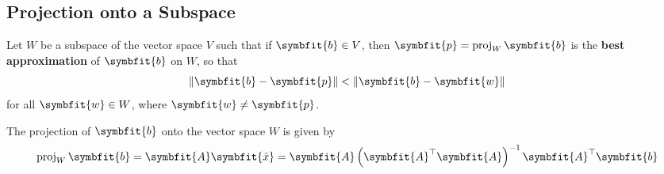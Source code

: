 \documentclass{article}
\begin{document}
	\subsection{Projection onto a Subspace}
	\begin{theorem}
		Let $W$ be a subspace of the vector space $V$ such that if $\symbfit{b}\in V$, then $\symbfit{p}=\proj_{W}\symbfit{b}$ is the \textbf{best approximation} of $\symbfit{b}$ on $W$, so that
		\begin{equation*}
			\norm{\symbfit{b}-\symbfit{p}}<\norm{\symbfit{b}-\symbfit{w}}
		\end{equation*}
		for all $\symbfit{w}\in W$, where $\symbfit{w}\neq \symbfit{p}$.
	\end{theorem}
	\begin{theorem}
		The projection of $\symbfit{b}$ onto the vector space $W$ is given by
		\begin{equation*}
			\proj_{W}\symbfit{b} = \symbfit{A}\symbfit{\hat{x}} = \symbfit{A}\left( \symbfit{A}^\top \symbfit{A} \right)^{-1}\symbfit{A}^\top \symbfit{b}
		\end{equation*}
	\end{theorem}
\end{document}
